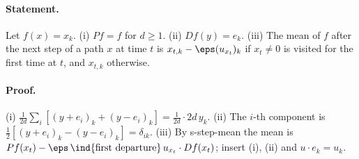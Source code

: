 \paragraph{Statement.} Let $f(x)=x_k$. (i) $Pf=f$ for $d\geq1$. (ii) $Df(y)=e_k$. (iii) The mean of $f$
after the next step of a path $x$ at time $t$ is $x_{t,k}-\eps(u_{x_t})_k$ if $x_t\neq0$ is visited for the
first time at $t$, and $x_{t,k}$ otherwise.
\paragraph{Proof.} (i) $\frac1{2d}\sum_i[(y+e_i)_k+(y-e_i)_k]=\frac1{2d}\cdot2d\,y_k$. (ii) The $i$-th component
is $\frac12[(y+e_i)_k-(y-e_i)_k]=\delta_{ik}$. (iii) By s-step-mean the mean is
$Pf(x_t)-\eps\,\ind\{\text{first departure}\}\,u_{x_t}\cdot Df(x_t)$; insert (i), (ii) and
$u\cdot e_k=u_k$.
